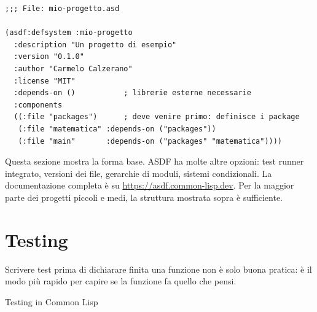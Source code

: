\begin{esempio}
\begin{lstlisting}
;;; File: mio-progetto.asd

(asdf:defsystem :mio-progetto
  :description "Un progetto di esempio"
  :version "0.1.0"
  :author "Carmelo Calzerano"
  :license "MIT"
  :depends-on ()           ; librerie esterne necessarie
  :components
  ((:file "packages")      ; deve venire primo: definisce i package
   (:file "matematica" :depends-on ("packages"))
   (:file "main"       :depends-on ("packages" "matematica"))))
\end{lstlisting}
\end{esempio}

\begin{nota}
Questa sezione mostra la forma base.
ASDF ha molte altre opzioni: test runner integrato, versioni
dei file, gerarchie di moduli, sistemi condizionali.
La documentazione completa è su \url{https://asdf.common-lisp.dev}.
Per la maggior parte dei progetti piccoli e medi,
la struttura mostrata sopra è sufficiente.
\end{nota}

\section{Testing}

Scrivere test prima di dichiarare finita una funzione
non è solo buona pratica: è il modo più rapido
per capire se la funzione fa quello che pensi.

\begin{concetto}{Testing in Common Lisp}
\end{concetto}


